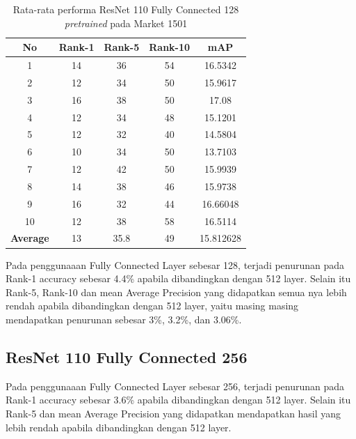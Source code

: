 \begin{longtable}{|c|c|c|c|c|}
	\caption{Rata-rata performa ResNet 110 Fully Connected 128 \textit{pretrained} pada Market 1501 }
	\label{tabel: 14}\\
	\hline
	\rowcolor[HTML]{C0C0C0}
	\textbf{No} &\textbf{Rank-1} & \textbf{Rank-5} & \textbf{Rank-10} & \textbf{mAP} \\
	\hline
	1 &14 &36 &54 &16.5342 \\
	2 &12 &34 &50 &15.9617 \\
	3 &16 &38 &50 &17.08 \\
	4 &12 &34 &48 &15.1201 \\
	5 &12 &32 &40 &14.5804 \\
	6 &10 &34 &50 &13.7103 \\
	7 &12 &42 &50 &15.9939 \\
	8 &14 &38 &46 &15.9738 \\
	9 &16 &32 &44 &16.66048 \\
	10 &12 &38 &58 &16.5114 \\
	\hline
	\textbf{Average} & 13 & 35.8 & 49 &15.812628 \\
	\hline
\end{longtable}
	Pada penggunaaan Fully Connected Layer sebesar 128, terjadi penurunan pada Rank-1 accuracy sebesar 4.4\% apabila dibandingkan dengan 512 layer. Selain itu Rank-5, Rank-10 dan mean Average Precision yang didapatkan semua nya lebih rendah apabila dibandingkan dengan 512 layer, yaitu masing masing mendapatkan penurunan sebesar 3\%, 3.2\%, dan 3.06\%.
	
\subsection{ResNet 110 Fully Connected 256}
Pada penggunaaan Fully Connected Layer sebesar 256, terjadi penurunan pada Rank-1 accuracy sebesar 3.6\% apabila dibandingkan dengan 512 layer. Selain itu Rank-5 dan mean Average Precision yang didapatkan mendapatkan hasil yang lebih rendah apabila dibandingkan dengan 512 layer. 


